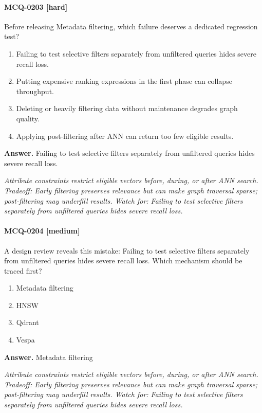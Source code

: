 \paragraph{MCQ-0203 [hard]} Before releasing Metadata filtering, which failure deserves a dedicated regression test?
\begin{enumerate}[label=\Alph*.]
\item Failing to test selective filters separately from unfiltered queries hides severe recall loss.
\item Putting expensive ranking expressions in the first phase can collapse throughput.
\item Deleting or heavily filtering data without maintenance degrades graph quality.
\item Applying post-filtering after ANN can return too few eligible results.
\end{enumerate}
\noindent\textbf{Answer.} Failing to test selective filters separately from unfiltered queries hides severe recall loss.
\par\textit{Attribute constraints restrict eligible vectors before, during, or after ANN search. Tradeoff: Early filtering preserves relevance but can make graph traversal sparse; post-filtering may underfill results. Watch for: Failing to test selective filters separately from unfiltered queries hides severe recall loss.}
\paragraph{MCQ-0204 [medium]} A design review reveals this mistake: Failing to test selective filters separately from unfiltered queries hides severe recall loss. Which mechanism should be traced first?
\begin{enumerate}[label=\Alph*.]
\item Metadata filtering
\item HNSW
\item Qdrant
\item Vespa
\end{enumerate}
\noindent\textbf{Answer.} Metadata filtering
\par\textit{Attribute constraints restrict eligible vectors before, during, or after ANN search. Tradeoff: Early filtering preserves relevance but can make graph traversal sparse; post-filtering may underfill results. Watch for: Failing to test selective filters separately from unfiltered queries hides severe recall loss.}
